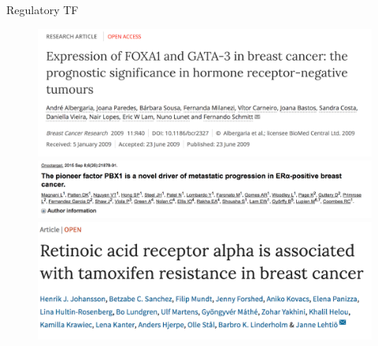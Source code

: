 \documentclass[slidestop,compress,11pt,xcolor=dvipsnames]{beamer}
\begin{document}
\begin{frame}{Regulatory TF}
 \vspace*{-0.3cm}
 \begin{figure}
  \centering
  \includegraphics[width=0.8\linewidth]{ELMER/paper4.png}\\
  \includegraphics[width=0.8\linewidth]{ELMER/paper1.png}\\
  \includegraphics[width=0.8\linewidth]{ELMER/paper2.png}
 \end{figure}
\end{frame}
\end{document}
